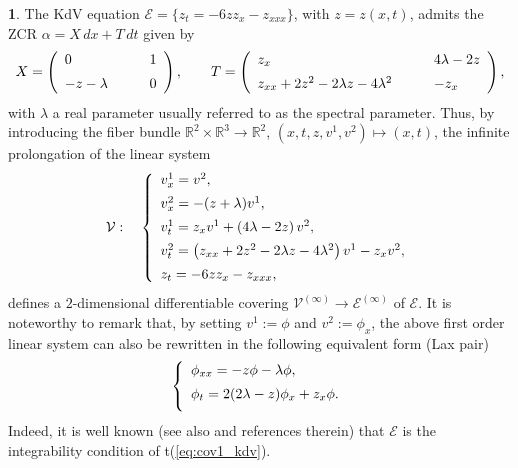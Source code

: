 \documentclass[12pt,english]{elsarticle}
\theoremstyle{plain}
\theoremstyle{plain}
\theoremstyle{remark}
\theoremstyle{plain}
\theoremstyle{definition}
\theoremstyle{definition}
\newtheorem{example}[thm]{\protect\examplename}
\providecommand{\examplename}{Example}
\begin{document}
\begin{example}
\label{example_KdV_lax1}
The KdV equation $\mathcal{E}=\{z_{t}=-6zz_{x}-z_{xxx}\}$, with
$z=z(x,t)$, admits the ZCR $\alpha =X\,dx+T\,dt$ given by
%
\begin{equation*}
X=\left (
%
\begin{array}{l@{\quad}l}
0 & 1
\vspace{5pt}
\\
-z-\lambda \qquad & 0
\end{array}
%
\right ),\qquad T=\left (
%
\begin{array}{l@{\quad}l}
z_{x} & 4\lambda -2z
\vspace{5pt}
\\
z_{xx}+2z^{2}-2\lambda z-4\lambda ^{2}\qquad & -z_{x}
\end{array}
%
\right ),
\end{equation*}
%
with $\lambda $ a real parameter usually referred to as the spectral parameter.
Thus, by introducing the fiber bundle
$\mathbb{R}^{2}\times \mathbb{R}^{3}\rightarrow \mathbb{R}^{2}$,
$(x,t,z,v^{1},v^{2})\mapsto (x,t)$, the infinite prolongation of the linear
system
%
\begin{equation}
\mathcal{V}:\quad \left \{
%
\begin{array}{l}
v_{x}^{1}=v^{2},
\vspace{5pt}
\\
v_{x}^{2}=-(z+\lambda )v^{1},
\vspace{5pt}
\\
v_{t}^{1}=z_{x}v^{1}+\left (4\lambda -2z\right )v^{2},
\vspace{5pt}
\\
v_{t}^{2}=\left (z_{xx}+2z^{2}-2\lambda z-4\lambda ^{2}\right )v^{1}-z_{x}v^{2},
\vspace{5pt}
\\
z_{t}=-6zz_{x}-z_{xxx},
\end{array}
%
\right .
\label{eq:cov2_KdV}
\end{equation}
%
defines a $2$-dimensional differentiable covering
$\mathcal{V}^{(\infty )}\longrightarrow \mathcal{E}^{(\infty )}$ of
$\mathcal{E}$. It is noteworthy to remark that, by setting
$v^{1}:=\phi $ and $v^{2}:=\phi _{x}$, the above first order linear system
can also be rewritten in the following equivalent form (Lax pair)
%
\begin{equation}
\left \{
%
\begin{array}{l}
\phi _{xx}=-z\phi -\lambda \phi ,
\vspace{5pt}
\\
\phi _{t}=2(2\lambda -z)\phi _{x}+z_{x}\phi .
\vspace{5pt}
\end{array}
%
\right .
\label{eq:cov1_kdv}
\end{equation}
%
Indeed, it is well known \cite{Miura-Gardner-Kruskal} (see also
\cite{CHZ,Lax,MatvSal,Taktajan} and references therein) that
$\mathcal{E}$ is the integrability condition of t{(\ref{eq:cov1_kdv})}.


\end{example}
\end{document}
